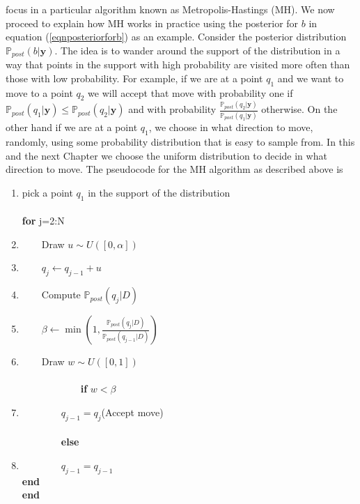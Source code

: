 \documentclass[12pt]{book}
\newcommand{\post}{\mathbb{P}_{post}}
\newcommand{\y}{\textbf{y}}
\begin{document}
focus in a particular algorithm known as Metropolis-Hastings  (MH). We now proceed  to explain
how MH works in practice using the posterior for $b$ in equation (\ref{eqnposteriorforb}) as an example. 
\newline
\newline
Consider the posterior distribution $\post(b|\y)$. The idea is to wander around the support of the distribution
in a way that points in the support with high probability are visited more often than those with low 
probability. For example, if we are at a point $q_{1}$ and we want to move to a point $q_{2}$ we will accept 
that move with probability one if $\post(q_{1}|\y)\leq\post(q_{2}|\y)$ and with probability 
$\frac{\post(q_{2}|\y)}{\post(q_{1}|\y)}$ otherwise. On the other hand if we are at a point $q_{1}$, we choose
in what direction to move, randomly, using some probability distribution that is easy to sample from.
In this and the next Chapter we choose the uniform distribution to decide in what  direction to move.
The pseudocode  for the MH algorithm as described above is \cite{Somersalo}

\begin{enumerate}
\item pick a point $q_{1}$ in the support of the distribution\\
\\
\textbf{for} j=2:N
\item $\qquad$Draw $u\sim U([0,\alpha])$
\item $\qquad q_{j}\leftarrow q_{j-1}+u$
\item $\qquad$Compute $\post(q_{j}|D)$
\item $\qquad\beta\leftarrow\min(1,\frac{\post(q_{j}|D)}{\post(q_{j-1}|D)})$
\item $\qquad$Draw $w\sim U([0,1])$\\
\\
$\qquad\qquad\qquad$\textbf{if} $w<\beta$ 
\item $\qquad\qquad q_{j-1}=q_{j}$\qquad(Accept move)\\
\\
$\qquad\qquad$\textbf{else}
\item
	$\qquad\qquad q_{j-1}=q_{j-1}$\\
\textbf{end}\\
\textbf{end}
\end{enumerate}
\end{document}
